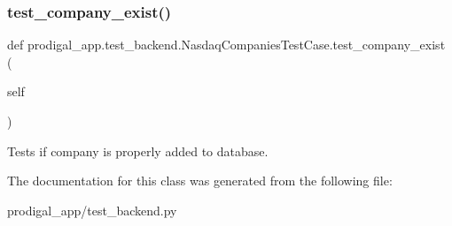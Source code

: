 \subsubsection{\texorpdfstring{test\+\_\+company\+\_\+exist()}{test\_company\_exist()}}
{\footnotesize\ttfamily def prodigal\+\_\+app.\+test\+\_\+backend.\+Nasdaq\+Companies\+Test\+Case.\+test\+\_\+company\+\_\+exist (\begin{DoxyParamCaption}\item[{}]{self }\end{DoxyParamCaption})}

\begin{DoxyVerb}Tests if company is properly added to database.
\end{DoxyVerb}
 

The documentation for this class was generated from the following file\+:\begin{DoxyCompactItemize}
\item 
prodigal\+\_\+app/test\+\_\+backend.\+py\end{DoxyCompactItemize}
